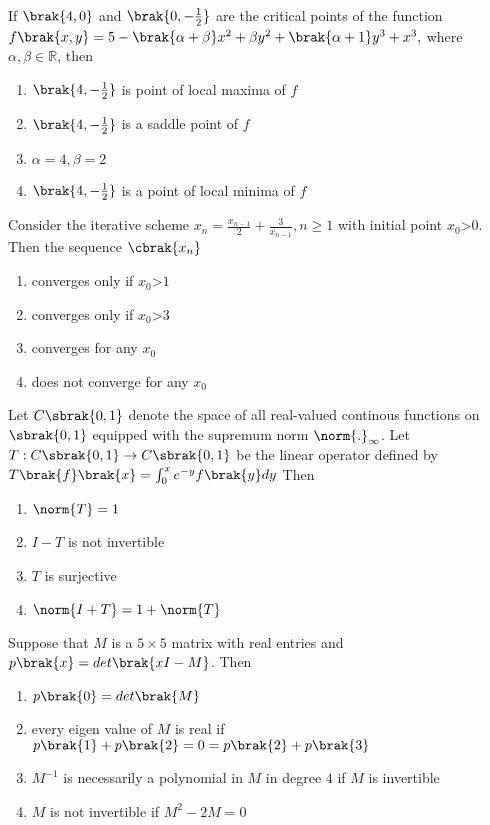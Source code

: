 \item{
If $\brak{4,0}$ and $\brak{0,-\frac{1}{2}}$ are the critical points of the function $f\brak{x,y}=5-\brak{\alpha+\beta}x^2+\beta y^2+\brak{\alpha+1}y^3+x^3,$ where $\alpha,\beta\in\mathbb{R}$, then
\begin{multicols}{2}
\begin{enumerate}
\item $\brak{4,-\frac{1}{2}}$ is point of local maxima of $f$
\item $\brak{4,-\frac{1}{2}}$ is a saddle point of $f$
\item $\alpha=4,\beta=2$
\item $\brak{4,-\frac{1}{2}}$ is a point of local minima of $f$
\end{enumerate}
\end{multicols}
}
\item{
Consider the iterative scheme $x_n=\frac{x_{n-1}}{2}+\frac{3}{x_{n-1}},n\geq 1$ with initial point $x_0$\textgreater$0$. Then the sequence $\cbrak{x_n}$ 
\begin{multicols}{2}
\begin{enumerate}
\item converges only if $x_0$\textgreater$1$
\item converges only if $x_0$\textgreater$3$
\item converges for any $x_0$
\item does not converge for any $x_0$
\end{enumerate}
\end{multicols}
}
\item{
Let $C\sbrak{0,1}$ denote the space of all real-valued continous functions on $\sbrak{0,1}$ equipped with the supremum norm $\norm{.}_{\infty}$. Let $T:C\sbrak{0,1}\rightarrow C\sbrak{0,1}$ be the linear operator defined by $T\brak{f}\brak{x}=\int_0^xe^{-y}f\brak{y}dy$ Then
\begin{multicols}{2}
\begin{enumerate}
\item $\norm{T}=1$
\item $I-T$ is not invertible
\item $T$ is surjective 
\item $\norm{I+T}=1+\norm{T}$
\end{enumerate}
\end{multicols}
}
\item{
Suppose that $M$ is a $5\times 5$ matrix with real entries and $p\brak{x}=det\brak{xI-M}$. Then
\begin{enumerate}
\item $p\brak{0}=det\brak{M}$
\item every eigen value of $M$ is real if $p\brak{1}+p\brak{2}=0=p\brak{2}+p\brak{3}$
\item $M^{-1}$ is necessarily a polynomial in $M$ in degree $4$ if $M$ is invertible 
\item $M$ is not invertible if $M^2-2M=0$ 
\end{enumerate}
}
